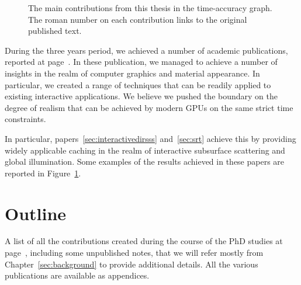 \begin{figure}
\caption{The main contributions from this thesis in the time-accuracy graph. The roman number on each contribution links to the original published text.} 
\label{fig:main_results}
\end{figure}

During the three years period, we achieved a number of academic publications, reported at page~\pageref{sec:contributionlist}. In these publication, we managed to achieve a number of insights in the realm of computer graphics and material appearance. In particular, we created a range of techniques that can be readily applied to existing interactive applications. We believe we pushed the boundary on the degree of realism that can be achieved by modern GPUs on the same strict time constraints. 

In particular, papers~\ref{sec:interactivedirsss} and~\ref{sec:srt} achieve  this by providing widely applicable caching in the realm of interactive subsurface scattering and global illumination. Some examples of the results achieved in these papers are reported in Figure~\ref{fig:main_results}.

\section{Outline}

A list of all the contributions created during the course of the PhD studies at page~\pageref{sec:contributionlist}, including some unpublished notes, that we will refer mostly from Chapter~\ref{sec:background} to provide additional details. All the various publications are available as appendices. 

